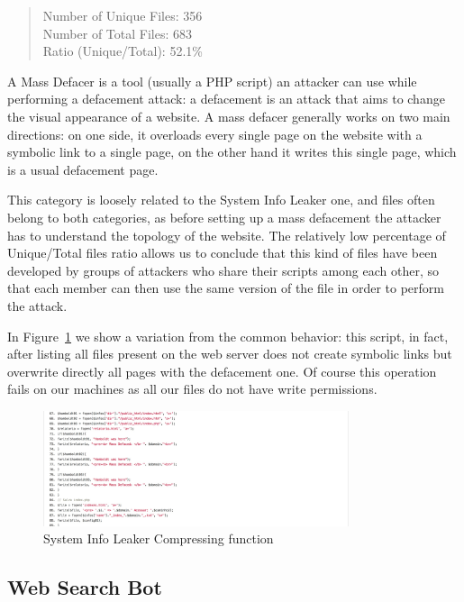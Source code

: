 \begin{quote}
Number of Unique Files: 356\\
Number of Total Files: 683\\
Ratio (Unique/Total): 52.1\%
\end{quote}

A Mass Defacer is a tool (usually a PHP script) an attacker can use while performing a defacement attack: a defacement is an attack that aims to change the visual appearance of a website. A mass defacer generally works on two main directions: on one side, it overloads every single page on the website with a symbolic link to a single page, on the other hand it writes this single page, which is a usual defacement page.

This category is loosely related to the System Info Leaker one, and files often belong to both categories, as before setting up a mass defacement the attacker has to understand the topology of the website. The relatively low percentage of Unique/Total files ratio allows us to conclude that this kind of files have been developed by groups of attackers who share their scripts among each other, so that each member can then use the same version of the file in order to perform the attack.

In Figure~\ref{fig:massDefacement} we show a variation from the common behavior: this script, in fact, after listing all files present on the web server does not create symbolic links but overwrite directly all pages with the defacement one. Of course this operation fails on our machines as all our files do not have write permissions.

\begin{figure}[H]
\centerline{\includegraphics[width=0.8\textwidth]{Images/massDefacement.jpg}}
\caption{System Info Leaker Compressing function\label{fig:massDefacement}}
\end{figure}

\subsection{Web Search Bot}

